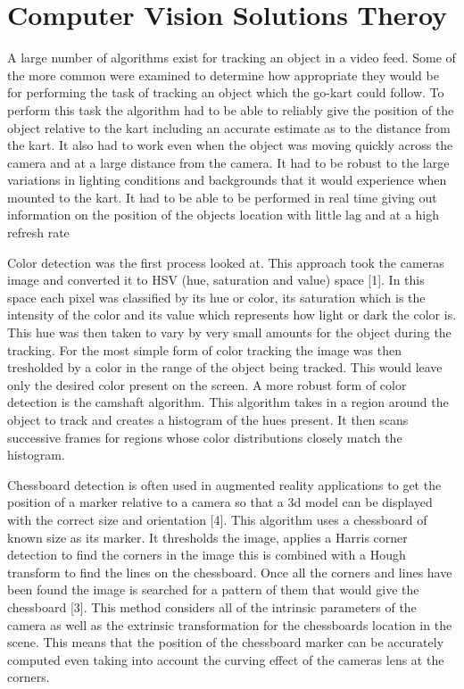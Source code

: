 \section{Computer Vision Solutions Theroy}

A large number of algorithms exist for tracking an object in a video feed. Some of the more common were examined to determine how appropriate they would be for performing the task of tracking an object which the go-kart could follow. To perform this task the algorithm had to be able to reliably give the position of the object relative to the kart including an accurate estimate as to the distance from the kart. It also had to work even when the object was moving quickly across the camera and at a large distance from the camera. It had to be robust to the large variations in lighting conditions and backgrounds that it would experience when mounted to the kart. It had to be able to be performed in real time giving out information on the position of the objects location with little lag and at a high refresh rate

Color detection was the first process looked at. This approach took the cameras image and converted it to HSV (hue, saturation and value) space [1]. In this space each pixel was classified by its hue or color, its saturation which is the intensity of the color and its value which represents how light or dark the color is. This hue was then taken to vary by very small amounts  for the object during the tracking. For the most simple form of color tracking the image was then tresholded by a color in the range of the object being tracked. This would leave only the desired color present on the screen. A more robust form of color detection is the camshaft algorithm. This algorithm takes in a region around the object to track and creates a histogram of the hues present. It then scans successive frames for regions whose color distributions closely match the histogram.  

Chessboard detection is often used in augmented reality applications to get the position of a marker relative to a camera so that a 3d model can be displayed with the correct size and orientation [4]. This algorithm uses a chessboard of known size as its marker. It thresholds the image, applies a Harris corner detection to find the corners in the image this is combined with a Hough transform to find the lines on the chessboard. Once all the corners and lines have been found the image is searched for a pattern of them that would give the chessboard [3]. This method considers all of the intrinsic parameters of the camera as well as the extrinsic transformation for the chessboards location in the scene. This means that the position of the chessboard marker can be accurately computed even taking into  account the curving effect of the cameras lens at the corners. 

